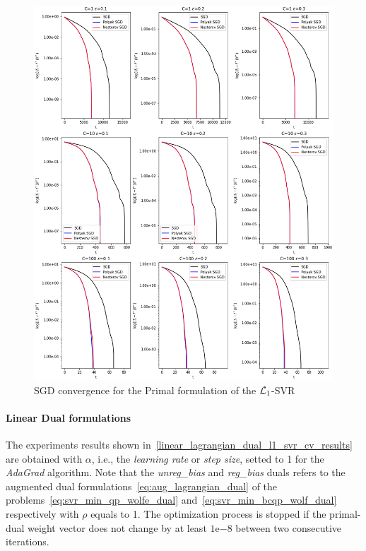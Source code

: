 \begin{figure}[H]
	\centering
	\includegraphics[scale=0.5]{img/l1_svr_loss_history}
	\caption{SGD convergence for the Primal formulation of the $\protect \mathcal{L}_1$-SVR}
	\label{fig:l1_svr_loss_history}
\end{figure}

\pagebreak

\paragraph{Linear Dual formulations}

The experiments results shown in~\ref{linear_lagrangian_dual_l1_svr_cv_results} are obtained with $\alpha$, i.e., the \emph{learning rate} or \emph{step size}, setted to 1 for the \emph{AdaGrad} algorithm. Note that the \emph{unreg\_bias} and \emph{reg\_bias} duals refers to the augmented dual formulations~\eqref{eq:aug_lagrangian_dual} of the problems~\eqref{eq:svr_min_qp_wolfe_dual} and~\eqref{eq:svr_min_bcqp_wolf_dual} respectively with $\rho$ equals to 1. The optimization process is stopped if the primal-dual weight vector does not change by at least $1\mathrm{e}{-8}$  between two consecutive iterations.

